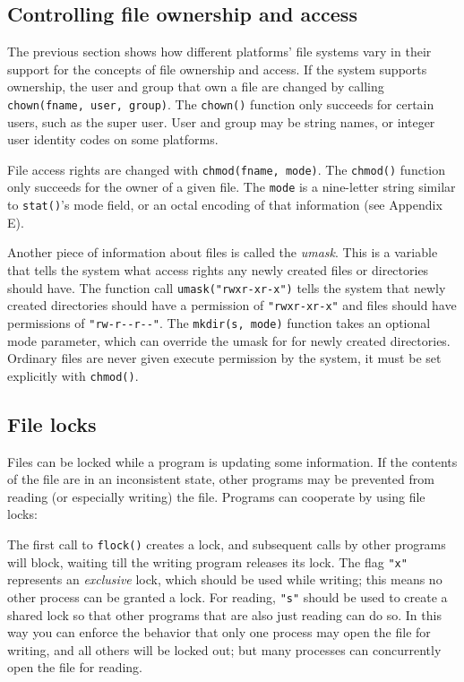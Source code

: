 \subsection*{Controlling file ownership and access}

The previous section shows how different
platforms' file systems vary in their support for the concepts of file
ownership and access. If the system supports ownership, the user and
group that own a file are changed by calling \texttt{chown(fname,
user, group)}. The \texttt{chown()} function only
succeeds for certain users, such as the super user.  User and group
may be string names, or integer user identity codes on some platforms.

File access rights are changed with \texttt{chmod(fname, mode)}. The
\texttt{chmod()} function only succeeds for the owner of a given
file. The \texttt{mode} is a nine-letter string similar to \texttt{stat()}'s
mode field, or an octal encoding of that information (see Appendix E).

Another piece of information about files is called the
\textit{umask}. This is a variable that tells the system what
access rights any newly created files or directories should have.  The function
call \texttt{umask("rwxr-xr-x")} tells the system that newly created directories
should have a permission of \texttt{"rwxr-xr-x"} and files should have
permissions of \texttt{"rw-r-{}-r-{}-"}.  The \texttt{mkdir(s, mode)} function
takes an optional mode parameter, which can override the umask for for newly
created directories.  Ordinary files are never given execute permission by the
system, it must be set explicitly with \texttt{chmod()}.

\subsection*{File locks}

Files can be locked while a program is updating some
information. If the contents of the file are in an inconsistent state, other
programs may be prevented from reading (or especially writing) the
file. Programs can cooperate by using file locks:


\noindent
The first call to \texttt{flock()} creates a lock, and subsequent
calls by other programs will block, waiting till the
writing program releases its lock. The flag
\texttt{"x"} represents an
\textit{exclusive} lock, which should be used while writing; this means
no other process can be granted a lock. For reading,
\texttt{"s"} should be used to create a
shared lock so that other programs that are also just reading can do
so. In this way you can enforce the behavior that only one process may
open the file for writing, and all others will be locked out; but many
processes can concurrently open the file for reading.

